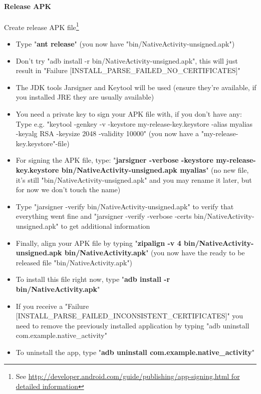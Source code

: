 \paragraph{Release \ac{APK}}
Create release \ac{APK} file\footnote{See \url{http://developer.android.com/guide/publishing/app-signing.html for detailed information}}
\begin{itemize}
\item{Type "\textbf{ant release}" (you now have "bin/NativeActivity-unsigned.apk")}
\item{\textrightarrow{} Don't try "adb install -r bin/NativeActivity-unsigned.apk", this will just result in "Failure [INSTALL\_PARSE\_FAILED\_NO\_CERTIFICATES]"}
\item{\textrightarrow{} The \ac{JDK} tools Jarsigner and Keytool will be used (ensure they're available, if you installed \ac{JRE} they are usually available)}
\item{\textrightarrow{} You need a private key to sign your \ac{APK} file with, if you don't have any: Type e.g. "keytool -genkey -v -keystore my-release-key.keystore -alias myalias -keyalg RSA -keysize 2048 -validity 10000" (you now have a "my-release-key.keystore"-file)}
\item{For signing the \ac{APK} file, type: "\textbf{jarsigner -verbose -keystore my-release-key.keystore bin/NativeActivity-unsigned.apk myalias}" (no new file, it's still "bin/NativeActivity-unsigned.apk" and you may rename it later, but for now we don't touch the name)}
\item{\textrightarrow{} Type "jarsigner -verify bin/NativeActivity-unsigned.apk" to verify that everything went fine and "jarsigner -verify -verbose -certs bin/NativeActivity-unsigned.apk" to get additional information}
\item{Finally, align your \ac{APK} file by typing "\textbf{zipalign -v 4 bin/NativeActivity-unsigned.apk bin/NativeActivity.apk}" (you now have the ready to be released file "bin/NativeActivity.apk")}
\item{To install this file right now, type "\textbf{adb install -r bin/NativeActivity.apk}"}
\item{\textrightarrow{} If you receive a "Failure [INSTALL\_PARSE\_FAILED\_INCONSISTENT\_CERTIFICATES]" you need to remove the previously installed application by typing "adb uninstall com.example.native\_activity"}
\item{\textrightarrow{} To uninstall the app, type "\textbf{adb uninstall com.example.native\_activity}"}
\end{itemize}




